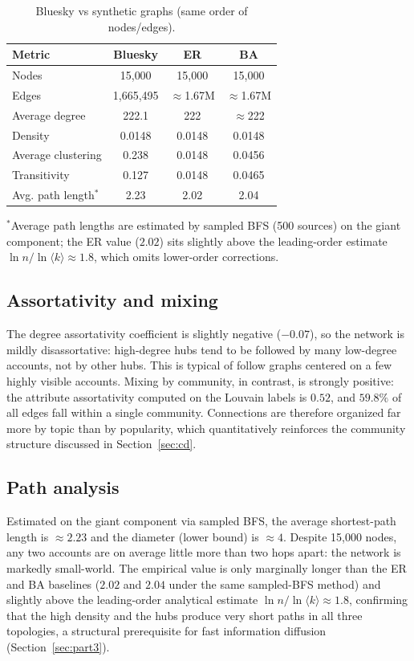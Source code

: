 \begin{table}[h]
  \centering\small
  \caption{Bluesky vs synthetic graphs (same order of nodes/edges).}
  \label{tab:compare}
  \begin{tabular}{lccc}
    \toprule
    Metric & Bluesky & ER & BA \\
    \midrule
    Nodes             & 15{,}000 & 15{,}000 & 15{,}000 \\
    Edges             & 1{,}665{,}495 & $\approx$1.67M & $\approx$1.67M \\
    Average degree    & 222.1 & 222 & $\approx$222 \\
    Density           & 0.0148 & 0.0148 & 0.0148 \\
    Average clustering & 0.238 & 0.0148 & 0.0456 \\
    Transitivity      & 0.127 & 0.0148 & 0.0465 \\
    Avg. path length$^{*}$  & 2.23 & 2.02 & 2.04 \\
    \bottomrule
  \end{tabular}
\end{table}

{\footnotesize $^{*}$Average path lengths are estimated by sampled BFS (500 sources) on the giant component; the ER value ($2.02$) sits slightly above the leading-order estimate $\ln n / \ln \langle k\rangle \approx 1.8$, which omits lower-order corrections.}


\subsection{Assortativity and mixing}
The degree assortativity coefficient is slightly negative ($-0.07$), so the network is mildly disassortative: high-degree hubs tend to be followed by many low-degree accounts, not by other hubs. This is typical of follow graphs centered on a few highly visible accounts. Mixing by community, in contrast, is strongly positive: the attribute assortativity computed on the Louvain labels is $0.52$, and $59.8\%$ of all edges fall within a single community. Connections are therefore organized far more by topic than by popularity, which quantitatively reinforces the community structure discussed in Section~\ref{sec:cd}.

\subsection{Path analysis}
Estimated on the giant component via sampled BFS, the average shortest-path length is $\approx 2.23$ and the diameter (lower bound) is $\approx 4$. Despite 15{,}000 nodes, any two accounts are on average little more than two hops apart: the network is markedly small-world. The empirical value is only marginally longer than the ER and BA baselines ($2.02$ and $2.04$ under the same sampled-BFS method) and slightly above the leading-order analytical estimate $\ln n / \ln \langle k\rangle \approx 1.8$, confirming that the high density and the hubs produce very short paths in all three topologies, a structural prerequisite for fast information diffusion (Section~\ref{sec:part3}).


